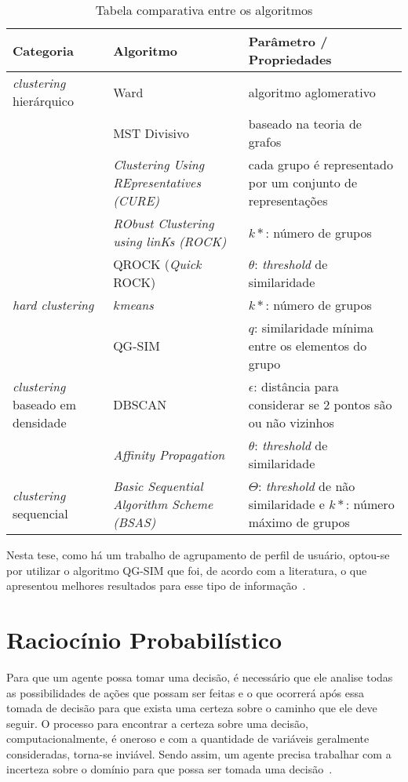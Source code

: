 \begin{table}[h!]
	\caption{Tabela comparativa entre os algoritmos}
	\label{tab:comp_algo_agrupamento}
	\begin{tabular}{ m{2.8cm} | m{5cm} | m{7cm} } \hline
	Categoria & Algoritmo & Parâmetro / Propriedades \\ \hline
	\emph{clustering} hierárquico & Ward & algoritmo aglomerativo \\ \hline
	& MST Divisivo & baseado na teoria de grafos \\ \hline
	& \emph{Clustering Using REpresentatives (CURE)} & cada grupo é representado por um conjunto de representações \\ \hline
	& \emph{RObust Clustering using linKs (ROCK)} & $k*$: número de grupos \\ \hline
	& QROCK (\emph{Quick} ROCK) & $\theta$: \emph{threshold} de similaridade  \\ \hline
	\emph{hard clustering} & $k$\emph{means} & $k*$: número de grupos \\ \hline
    & QG-SIM & $q$: similaridade mínima entre os elementos do grupo \\ \hline
	\emph{clustering} baseado em densidade & DBSCAN & $\epsilon$: distância para considerar se 2 pontos são ou não vizinhos \\ \hline
	& \emph{Affinity Propagation} & $\theta$: \emph{threshold} de similaridade  \\ \hline
	\emph{clustering} sequencial & \emph{Basic Sequential Algorithm Scheme (BSAS)} & $\Theta$: \emph{threshold} de não similaridade e $k*$: número máximo de grupos  \\ \hline
	\end{tabular}
\end{table}

Nesta tese, como há um trabalho de agrupamento de perfil de usuário, optou-se por utilizar o algoritmo QG-SIM que foi, de acordo com a literatura, o que apresentou melhores resultados para esse tipo de informação~\cite{masiero:2013}.

\section{Raciocínio Probabilístico}
\label{sec:raciocinio-probabilistico}
Para que um agente possa tomar uma decisão, é necessário que ele analise todas as possibilidades de ações que possam ser feitas e o que ocorrerá após essa tomada de decisão para que exista uma certeza sobre o caminho que ele deve seguir. O processo para encontrar a certeza sobre uma decisão, computacionalmente, é oneroso e com a quantidade de variáveis geralmente consideradas, torna-se inviável. Sendo assim, um agente precisa trabalhar com a incerteza sobre o domínio para que possa ser tomada uma decisão~\cite{russell:2002}.

